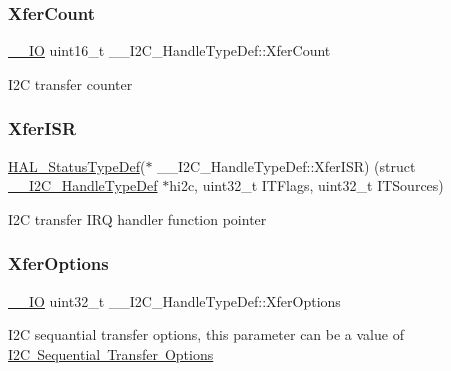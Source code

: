 \subsubsection{\texorpdfstring{XferCount}{XferCount}}
{\footnotesize\ttfamily \mbox{\hyperlink{core__sc300_8h_aec43007d9998a0a0e01faede4133d6be}{\+\_\+\+\_\+\+IO}} uint16\+\_\+t \+\_\+\+\_\+\+I2\+C\+\_\+\+Handle\+Type\+Def\+::\+Xfer\+Count}

I2C transfer counter \mbox{\label{struct_____i2_c___handle_type_def_a27f4f768395d68659c29ba55727182a2}} 
\subsubsection{\texorpdfstring{XferISR}{XferISR}}
{\footnotesize\ttfamily \mbox{\hyperlink{stm32f7xx__hal__def_8h_a63c0679d1cb8b8c684fbb0632743478f}{H\+A\+L\+\_\+\+Status\+Type\+Def}}($\ast$ \+\_\+\+\_\+\+I2\+C\+\_\+\+Handle\+Type\+Def\+::\+Xfer\+I\+SR) (struct \mbox{\hyperlink{struct_____i2_c___handle_type_def}{\+\_\+\+\_\+\+I2\+C\+\_\+\+Handle\+Type\+Def}} $\ast$hi2c, uint32\+\_\+t I\+T\+Flags, uint32\+\_\+t I\+T\+Sources)}

I2C transfer I\+RQ handler function pointer \mbox{\label{struct_____i2_c___handle_type_def_a5d3ace2bbb83f44d4fe3df47fa42bb90}} 
\subsubsection{\texorpdfstring{XferOptions}{XferOptions}}
{\footnotesize\ttfamily \mbox{\hyperlink{core__sc300_8h_aec43007d9998a0a0e01faede4133d6be}{\+\_\+\+\_\+\+IO}} uint32\+\_\+t \+\_\+\+\_\+\+I2\+C\+\_\+\+Handle\+Type\+Def\+::\+Xfer\+Options}

I2C sequantial transfer options, this parameter can be a value of \mbox{\hyperlink{group___i2_c___x_f_e_r_o_p_t_i_o_n_s}{I2C Sequential Transfer Options}} \mbox{\label{struct_____i2_c___handle_type_def_a1b8a62241b4c22d97af542186cef0c39}} 
